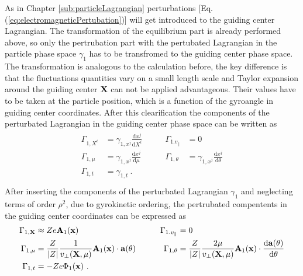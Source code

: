 As in Chapter \ref{sub:particleLagrangian} perturbations [Eq. (\ref{eq:electromagneticPertubation})] will get introduced to the guiding center Lagrangian. The transformation of the equilibrium part is already performed above, so only the pertrubation part with the pertubated Lagrangian in the particle phase space $\gamma_1$ has to be transfromed to the guiding center phase space. The transformation is analogous to the calculation before, the key difference is that the fluctuations quantities vary on a small length scale and Taylor expansion around the guiding center $\boldsymbol{\mathbf{X}}$ can not be applied advantageous. Their values have to be taken at the particle position, which is a function of the gyroangle in guiding center coordinates. After this clearification the components of the perturbated Lagrangian in the guiding center phase space can be written as
\begin{gather}
    \begin{aligned}
        \Gamma_{1, X^i} &= \gamma_{1, x^j} \frac{\mathrm{d}x^j}{\mathrm{d}X^i} &\qquad \Gamma_{1. v_\parallel} &= 0\\
        \Gamma_{1, \mu} &= \gamma_{1, x^j} \frac{\mathrm{d}x^j}{\mathrm{d}\mu} &\qquad \Gamma_{1, \theta}      &= \gamma_{1, x^j} \frac{\mathrm{d}x^j}{\mathrm{d}\theta}\\
        \Gamma_{1, t}   &= \gamma_{1,t} ~. & & \\
    \end{aligned}
    \label{eq:guidingcenterPertrubationLagrangianTrafo}
\end{gather}
After inserting the components of the perturbated Lagrangian $\gamma_1$ and neglecting terms of order $\rho^2$, due to gyrokinetic ordering, the pertrubated compentents in the guiding center coordinates can be expressed as
\begin{gather}
    \begin{aligned}
        \Gamma_{1, \boldsymbol{\mathbf{X}}} &\approx Ze\boldsymbol{\mathbf{A}}_{1}(\boldsymbol{\mathbf{x}})                                                           &\qquad \Gamma_{1. v_\parallel} &= 0 \\
        \Gamma_{1, \mu} &= \frac{Z}{\abs{Z}} \frac{1}{v_\perp(\boldsymbol{\mathbf{X}},\mu)} \boldsymbol{\mathbf{A}}_1(\boldsymbol{\mathbf{x}}) \cdot \boldsymbol{\mathbf{a}}(\theta) &\qquad \Gamma_{1, \theta}      &= \frac{Z}{\abs{Z}} \frac{2\mu}{v_\perp(\boldsymbol{\mathbf{X}},\mu)} \boldsymbol{\mathbf{A}}_1(\boldsymbol{\mathbf{x}}) \cdot \frac{\mathrm{d}\boldsymbol{\mathbf{a}}(\theta)}{\mathrm{d}\theta} \\
        \Gamma_{1, t}   &= -Ze \Phi_1(\boldsymbol{\mathbf{x}}) ~. & & \\
    \end{aligned}
    \label{eq:guidingcenterPertrubationLagrangian}
\end{gather}
